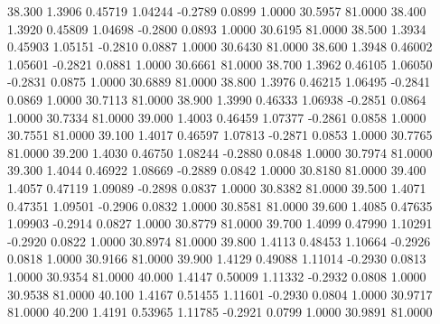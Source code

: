   38.300   1.3906   0.45719   1.04244  -0.2789   0.0899   1.0000  30.5957  81.0000
  38.400   1.3920   0.45809   1.04698  -0.2800   0.0893   1.0000  30.6195  81.0000
  38.500   1.3934   0.45903   1.05151  -0.2810   0.0887   1.0000  30.6430  81.0000
  38.600   1.3948   0.46002   1.05601  -0.2821   0.0881   1.0000  30.6661  81.0000
  38.700   1.3962   0.46105   1.06050  -0.2831   0.0875   1.0000  30.6889  81.0000
  38.800   1.3976   0.46215   1.06495  -0.2841   0.0869   1.0000  30.7113  81.0000
  38.900   1.3990   0.46333   1.06938  -0.2851   0.0864   1.0000  30.7334  81.0000
  39.000   1.4003   0.46459   1.07377  -0.2861   0.0858   1.0000  30.7551  81.0000
  39.100   1.4017   0.46597   1.07813  -0.2871   0.0853   1.0000  30.7765  81.0000
  39.200   1.4030   0.46750   1.08244  -0.2880   0.0848   1.0000  30.7974  81.0000
  39.300   1.4044   0.46922   1.08669  -0.2889   0.0842   1.0000  30.8180  81.0000
  39.400   1.4057   0.47119   1.09089  -0.2898   0.0837   1.0000  30.8382  81.0000
  39.500   1.4071   0.47351   1.09501  -0.2906   0.0832   1.0000  30.8581  81.0000
  39.600   1.4085   0.47635   1.09903  -0.2914   0.0827   1.0000  30.8779  81.0000
  39.700   1.4099   0.47990   1.10291  -0.2920   0.0822   1.0000  30.8974  81.0000
  39.800   1.4113   0.48453   1.10664  -0.2926   0.0818   1.0000  30.9166  81.0000
  39.900   1.4129   0.49088   1.11014  -0.2930   0.0813   1.0000  30.9354  81.0000
  40.000   1.4147   0.50009   1.11332  -0.2932   0.0808   1.0000  30.9538  81.0000
  40.100   1.4167   0.51455   1.11601  -0.2930   0.0804   1.0000  30.9717  81.0000
  40.200   1.4191   0.53965   1.11785  -0.2921   0.0799   1.0000  30.9891  81.0000
